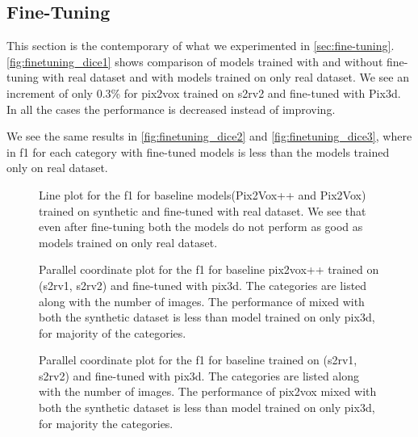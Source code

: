 \subsection{Fine-Tuning}\label{subsec:fine-tuning-dice}

This section is the contemporary of what we experimented in \autoref{sec:fine-tuning}.
\autoref{fig:finetuning_dice1} shows comparison of models trained with and without fine-tuning with real dataset and with models trained on only real dataset.
We see an increment of only 0.3\% for pix2vox trained on \gls{s2rv2} and fine-tuned with Pix3d.
In all the cases the performance is decreased instead of improving.

We see the same results in \autoref{fig:finetuning_dice2} and \autoref{fig:finetuning_dice3}, where in \gls{f1} for each category with fine-tuned models is less than the models trained only on real dataset.

\begin{figure}
    \centering
    \resizebox{0.6\textwidth}{!}{}
    \caption{Line plot for the \gls{f1} for baseline models(Pix2Vox++ and Pix2Vox) trained on synthetic and fine-tuned with real dataset.
    We see that even after fine-tuning both the models do not perform as good as models trained on only real dataset.}
    \label{fig:finetuning_dice1}
\end{figure}

\begin{figure}
    \centering
    \resizebox{0.75\textwidth}{!}{}
    \caption{Parallel coordinate plot for the \gls{f1} for baseline pix2vox++ trained on (\gls{s2rv1}, \gls{s2rv2}) and fine-tuned with pix3d.
    The categories are listed along with the number of images.
    The performance of  mixed with both the synthetic dataset is less than model trained on only pix3d, for majority of the categories.
    }
    \label{fig:finetuning_dice2}
\end{figure}

\begin{figure}
    \centering
    \resizebox{0.75\textwidth}{!}{}
    \caption{Parallel coordinate plot for the \gls{f1} for baseline  trained on (\gls{s2rv1}, \gls{s2rv2}) and fine-tuned with pix3d.
    The categories are listed along with the number of images.
    The performance of pix2vox mixed with both the synthetic dataset is less than model trained on only pix3d, for majority the categories.}
    \label{fig:finetuning_dice3}
\end{figure}

